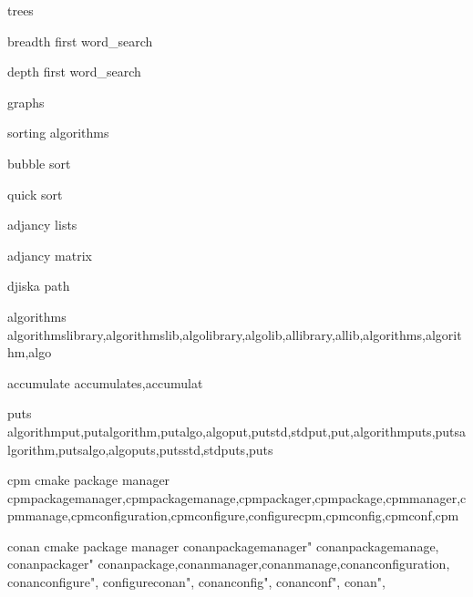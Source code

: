          trees 
        
         breadth first word_search 
        
         depth first word_search 
        
         graphs 
        
         sorting algorithms 
        
         bubble sort 
        
         quick sort 
        
         adjancy lists
        
         adjancy matrix 
        
         djiska path 
        
         algorithms 
        algorithmslibrary,algorithmslib,algolibrary,algolib,allibrary,allib,algorithms,algorithm,algo
        
         accumulate
        accumulates,accumulat
        
         puts 
        algorithmput,putalgorithm,putalgo,algoput,putstd,stdput,put,algorithmputs,putsalgorithm,putsalgo,algoputs,putsstd,stdputs,puts 
        
         cpm cmake package manager
        cpmpackagemanager,cpmpackagemanage,cpmpackager,cpmpackage,cpmmanager,cpmmanage,cpmconfiguration,cpmconfigure,configurecpm,cpmconfig,cpmconf,cpm  
        
         conan cmake package manager
        conanpackagemanager" conanpackagemanage, conanpackager" conanpackage,conanmanager,conanmanage,conanconfiguration, conanconfigure", configureconan", conanconfig", conanconf", conan",
